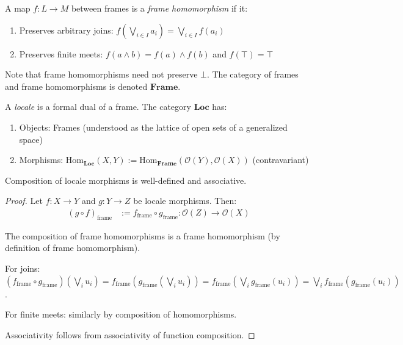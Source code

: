 \begin{definition}
  \label{def:frame-homomorphism}
  \leanok
  A map $f: L \to M$ between frames is a \emph{frame homomorphism} if it:
  \begin{enumerate}
    \item Preserves arbitrary joins: $f(\bigvee_{i \in I} a_i) = \bigvee_{i \in I} f(a_i)$
    \item Preserves finite meets: $f(a \land b) = f(a) \land f(b)$ and $f(\top) = \top$
  \end{enumerate}
\end{definition}

\begin{remark}
  \label{remark:frame-homomorphism-bottom}
  Note that frame homomorphisms need not preserve $\bot$. The category of frames and frame homomorphisms is denoted $\mathbf{Frame}$.
\end{remark}

\begin{definition}[Locale]
  \label{def:locale}
  \leanok
  A \emph{locale} is a formal dual of a frame. The category $\mathbf{Loc}$ has:
  \begin{enumerate}
    \item Objects: Frames (understood as the lattice of open sets of a generalized space)
    \item Morphisms: $\mathrm{Hom}_{\mathbf{Loc}}(X, Y) := \mathrm{Hom}_{\mathbf{Frame}}(\mathcal{O}(Y), \mathcal{O}(X))$ (contravariant)
  \end{enumerate}
\end{definition}

\begin{lemma}
  \label{lemma:locale-morphism-composition}
  \leanok
  Composition of locale morphisms is well-defined and associative.
\end{lemma}

\begin{proof}
  \leanok
  Let $f: X \to Y$ and $g: Y \to Z$ be locale morphisms. Then:
  \begin{align*}
    (g \circ f)_{\mathrm{frame}} &:= f_{\mathrm{frame}} \circ g_{\mathrm{frame}} : \mathcal{O}(Z) \to \mathcal{O}(X)
  \end{align*}

  The composition of frame homomorphisms is a frame homomorphism (by definition of frame homomorphism).

  For joins: $(f_{\mathrm{frame}} \circ g_{\mathrm{frame}})(\bigvee_{i} u_i) = f_{\mathrm{frame}}(g_{\mathrm{frame}}(\bigvee_i u_i)) = f_{\mathrm{frame}}(\bigvee_i g_{\mathrm{frame}}(u_i)) = \bigvee_i f_{\mathrm{frame}}(g_{\mathrm{frame}}(u_i))$.

  For finite meets: similarly by composition of homomorphisms.

  Associativity follows from associativity of function composition.
\end{proof}

